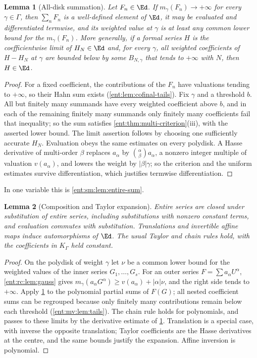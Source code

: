 \documentclass[11pt]{article}
\theoremstyle{plain}
\newtheorem{lemma}[lemma]{Lemma}
\theoremstyle{plain}
\theoremstyle{plain}
\theoremstyle{definition}
\theoremstyle{definition}
\theoremstyle{definition}
\theoremstyle{definition}
\theoremstyle{remark}
\newcommand{\K}{K_\Gamma}\newcommand{\KD}{K_\Delta}
\begin{document}
\begin{lemma}[All-disk summation]\label{ent:rc:lem:sum}
Let $F_n\in\Ed$. If $m_\gamma(F_n)\to+\infty$ for every $\gamma\in\Gamma$,
then $\sum_nF_n$ is a well-defined element of $\Ed$, it may be evaluated and
differentiated termwise, and its weighted value at $\gamma$ is at least any
common lower bound for the $m_\gamma(F_n)$. More generally, if a formal series
$H$ is the coefficientwise limit of $H_N\in\Ed$ and, for every $\gamma$,
all weighted coefficients of $H-H_N$ at $\gamma$ are bounded below by some
$B_{N,\gamma}$ that tends to $+\infty$ with $N$, then $H\in\Ed$.
\end{lemma}
\begin{proof}
For a fixed coefficient, the contributions of the $F_n$ have valuations
tending to $+\infty$, so their Hahn sum exists (\cref{ent:lem:cofinal-tails}).
Fix $\gamma$ and a threshold $b$. All but finitely many summands have every
weighted coefficient above $b$, and in each of the remaining finitely many
summands only finitely many coefficients fail that inequality; so the sum
satisfies \cref{ent:thm:multi-criterion}(iii), with the asserted lower
bound. The limit assertion follows by choosing one sufficiently accurate
$H_N$. Evaluation obeys the same estimates on every polydisk. A Hasse
derivative of multi-order $\beta$ replaces $a_\alpha$ by
$\binom\alpha\beta a_\alpha$, a nonzero integer multiple of valuation
$v(a_\alpha)$, and lowers the weight by $|\beta|\gamma$; so the criterion and
the uniform estimates survive differentiation, which justifies termwise
differentiation.
\end{proof}

In one variable this is \cref{ent:sm:lem:entire-sum}.

\begin{lemma}[Composition and Taylor expansion]\label{ent:rc:lem:composition}
Entire series are closed under substitution of entire series, including
substitutions with nonzero constant terms, and evaluation commutes with
substitution. Translations and invertible affine maps induce automorphisms of
$\Ed$. The usual Taylor and chain rules hold, with the coefficients in $\K$
held constant.
\end{lemma}
\begin{proof}
On the polydisk of weight $\gamma$ let $\nu$ be a common lower bound for the
weighted values of the inner series $G_1,\ldots,G_s$. For an outer series
$F=\sum a_\alpha U^\alpha$, \cref{ent:rc:lem:gauss} gives
$m_\gamma(a_\alpha G^\alpha)\ge v(a_\alpha)+|\alpha|\nu$, and the right side
tends to $+\infty$. Apply \cref{ent:rc:lem:sum} to the polynomial partial sums
of $F(G)$; all nested coefficient sums can be regrouped because only finitely
many contributions remain below each threshold (\cref{ent:mv:lem:tails}). The
chain rule holds for polynomials, and passes to these limits by the derivative
estimate of \cref{ent:rc:lem:sum}. Translation is a special case, with inverse
the opposite translation; Taylor coefficients are the Hasse derivatives at the
centre, and the same bounds justify the expansion. Affine inversion is
polynomial.
\end{proof}
\end{document}
